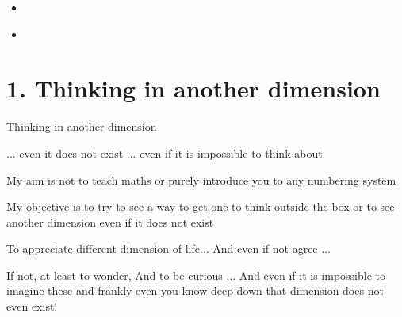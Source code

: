 \documentclass[letterpaper,10pt,english]{jupyterBook}
\begin{document}
\begin{itemize}
\item {} 
\sphinxAtStartPar
{\hyperref[\detokenize{testAnimated-Sinc-and-FT-example::doc}]{}}

\item {} 
\sphinxAtStartPar
{\hyperref[\detokenize{testNewton-outdatewarning::doc}]{}}

\end{itemize}

\sphinxstepscope


\chapter{1. Thinking in another dimension}
\label{\detokenize{MacTwgssA1-think:thinking-in-another-dimension}}\label{\detokenize{MacTwgssA1-think::doc}}
\begin{sphinxVerbatim}[commandchars=\\\{\}]
Thinking in another dimension

... even it does not exist
... even if it is impossible to think about
\end{sphinxVerbatim}

\begin{sphinxVerbatim}[commandchars=\\\{\}]
My aim is not to \PYGZdq{}teach\PYGZdq{} maths 
    or purely introduce you to any numbering system
    
My objective is to 
    try to see a way to get one to think outside the box
    or to see another dimension even if it does not exist

To appreciate different dimension of life...
       And even if not agree ... 

If not, at least to wonder, 
       And to be curious ...
            And even if it is impossible to imagine these
                and frankly even you know deep down that dimension does not even exist!
\end{sphinxVerbatim}
\end{document}
